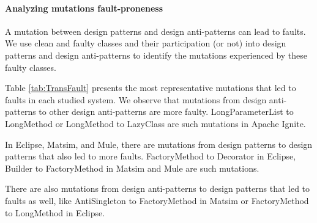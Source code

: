 \paragraph{\textbf{Analyzing mutations fault-proneness}} A mutation between design patterns and design anti-patterns can lead to faults. We use clean and faulty classes and their participation (or not) into design patterns and design anti-patterns to identify the mutations experienced by these faulty classes.

Table \ref{tab:TransFault} presents the most representative mutations that led to faults in each studied system. We observe that mutations from design anti-patterns to other design anti-patterns are more faulty. LongParameterList to LongMethod or LongMethod to LazyClass are such mutations in Apache Ignite. 

In Eclipse, Matsim, and Mule, there are mutations from design patterns to design patterns that also led to more faults. FactoryMethod to Decorator in Eclipse, Builder to FactoryMethod in Matsim and Mule are such mutations. 

There are also mutations from design anti-patterns to design patterns that led to faults as well, like AntiSingleton to FactoryMethod in Matsim or FactoryMethod to LongMethod in Eclipse. 


